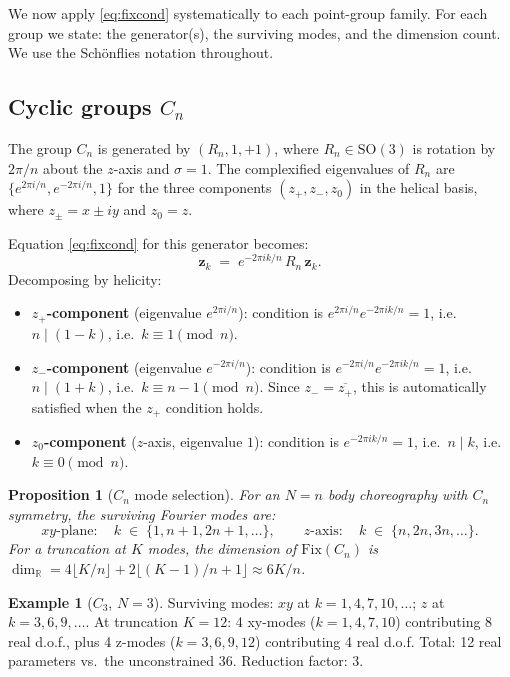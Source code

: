 \documentclass[12pt, a4paper]{article}
\theoremstyle{plain}
\newtheorem{proposition}[theorem]{Proposition}
\theoremstyle{definition}
\newtheorem{example}[theorem]{Example}
\newcommand{\R}{\mathbb{R}}
\newcommand{\Fix}{\mathrm{Fix}}
\newcommand{\bfz}{\mathbf{z}}
\newcommand{\SO}{\mathrm{SO}}
\begin{document}
We now apply \eqref{eq:fixcond} systematically to each point-group
family.  For each group we state: the generator(s), the surviving
modes, and the dimension count.  We use the Sch\"{o}nflies notation
throughout.

\subsection{Cyclic groups $C_n$}

The group $C_n$ is generated by $(R_n, 1, +1)$, where $R_n \in
\SO(3)$ is rotation by $2\pi/n$ about the $z$-axis and $\sigma = 1$.
The complexified eigenvalues of $R_n$ are $\{e^{2\pi i/n}, e^{-2\pi
i/n}, 1\}$ for the three components $(z_+, z_-, z_0)$ in the
helical basis, where $z_\pm = x \pm iy$ and $z_0 = z$.

Equation \eqref{eq:fixcond} for this generator becomes:
\[
  \bfz_k \;=\; e^{-2\pi ik/n}\,R_n\,\bfz_k.
\]
Decomposing by helicity:
\begin{itemize}[leftmargin=1.8em]
  \item \textbf{$z_+$-component} (eigenvalue $e^{2\pi i/n}$):
        condition is $e^{2\pi i/n} e^{-2\pi ik/n} = 1$,
        i.e.\ $n \mid (1-k)$, i.e.\ $k \equiv 1 \pmod{n}$.
  \item \textbf{$z_-$-component} (eigenvalue $e^{-2\pi i/n}$):
        condition is $e^{-2\pi i/n} e^{-2\pi ik/n} = 1$,
        i.e.\ $n \mid (1+k)$, i.e.\ $k \equiv n-1 \pmod{n}$.
        Since $z_- = \overline{z_+}$, this is automatically satisfied
        when the $z_+$ condition holds.
  \item \textbf{$z_0$-component} ($z$-axis, eigenvalue $1$):
        condition is $e^{-2\pi ik/n} = 1$,
        i.e.\ $n \mid k$, i.e.\ $k \equiv 0 \pmod{n}$.
\end{itemize}

\begin{proposition}[$C_n$ mode selection]\label{prop:cn}
For an $N=n$ body choreography with $C_n$ symmetry, the surviving
Fourier modes are:
\[
  xy\text{-plane}: \quad k \;\in\; \{1, n+1, 2n+1, \ldots\},
  \qquad
  z\text{-axis}: \quad k \;\in\; \{n, 2n, 3n, \ldots\}.
\]
For a truncation at $K$ modes, the dimension of $\Fix(C_n)$ is
$\dim_\R = 4\lfloor K/n \rfloor + 2\lfloor (K-1)/n + 1\rfloor
\approx 6K/n$.
\end{proposition}

\begin{example}[$C_3$, $N=3$]
Surviving modes: $xy$ at $k = 1, 4, 7, 10, \ldots$;
$z$ at $k = 3, 6, 9, \ldots$.  At truncation $K = 12$:
4 xy-modes ($k=1,4,7,10$) contributing 8 real d.o.f.,
plus 4 z-modes ($k=3,6,9,12$) contributing 4 real d.o.f.
Total: 12 real parameters vs.\ the unconstrained 36. Reduction factor: 3.
\end{example}
\end{document}
